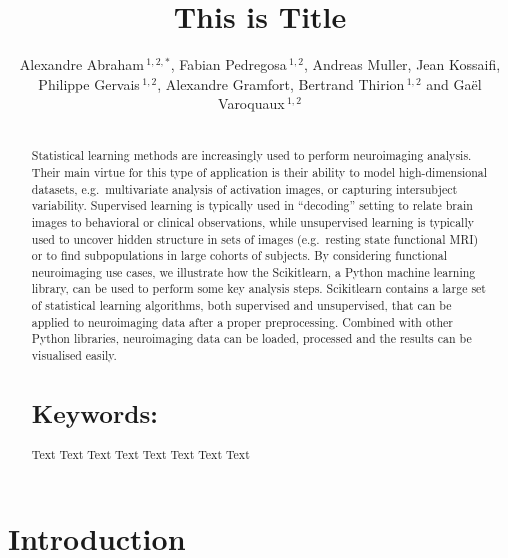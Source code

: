 \documentclass{frontiersSCNS} %
\def\firstAuthorLast{Sample {et~al}} %
\def\Authors{Alexandre Abraham\,$^{1,2,*}$, Fabian Pedregosa\,$^{1,2}$, Andreas Muller, Jean Kossaifi, Philippe Gervais\,$^{1,2}$, Alexandre Gramfort, Bertrand Thirion\,$^{1,2}$ and Gaël Varoquaux\,$^{1,2}$}
\begin{document}
\onecolumn
{}

\title[Running Title]{This is Title}
\author[\firstAuthorLast ]{\Authors}
\address{}
\correspondance{}
\editor{}

\maketitle
\begin{abstract}

\section{}
Statistical  learning  methods  are   increasingly  used  to  perform
neuroimaging  analysis.  Their  main  virtue  for this  type  of  application
is  their  ability  to   model  high-dimensional  datasets,  e.g.\ multivariate
analysis  of activation  images,  or  capturing  inter­subject  variability.
Supervised  learning  is  typically  used  in  “decoding” setting  to  relate
brain   images  to  behavioral  or  clinical  observations,  while
unsupervised  learning  is  typically used  to  uncover  hidden  structure  in
sets  of  images   (e.g.\ resting  state  functional  MRI)  or  to  find
sub­populations  in  large  cohorts  of  subjects.   By  considering
functional  neuroimaging  use  cases,  we illustrate  how  the  Scikit­learn,
a  Python machine  learning  library,  can  be used to perform  some  key
analysis steps.  Scikit­learn  contains  a  large   set  of  statistical
learning  algorithms,  both  supervised  and unsupervised, that can be  applied
to neuroimaging data after a  proper preprocessing.  Combined  with  other
Python  libraries, neuroimaging data can be loaded, processed and the results
can be visualised easily.



\tiny
  \section{Keywords:} Text Text Text Text Text Text Text Text  %
\end{abstract}


\section{Introduction}


\end{document}
